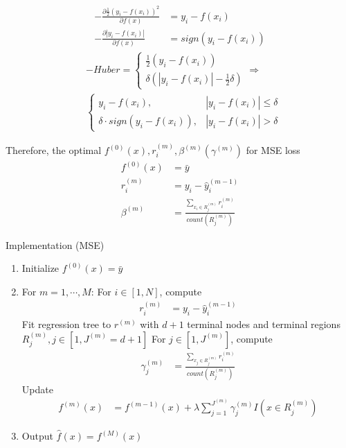 \documentclass[a4paper,12pt,landscape]{article}
\begin{document}
\begin{multicols}{3}
\begin{align*}
    -\frac{\partial\frac{1}{2}(y_i - f(x_i))^2}{\partial f(x)} &= y_i - f(x_i)\\
    -\frac{\partial |y_i - f(x_i)|}{\partial f(x)} &= sign(y_i - f(x_i))
\end{align*}
\begin{align*}
    &-Huber = \begin{cases}
        \frac{1}{2}(y_i - f(x_i))\\
        \delta (|y_i - f(x_i)| - \frac{1}{2}\delta)
        \end{cases} \Rightarrow \\
    &\begin{cases}
        y_i - f(x_i), &|y_i-f(x_i)| \leq \delta\\
        \delta \cdot sign(y_i - f(x_i)), &|y_i - f(x_i)| > \delta
    \end{cases}
\end{align*}

Therefore, the optimal $f^{(0)}(x), r_{i}^{(m)}, \beta^{(m)} (\gamma^{(m)})$ for MSE loss
\begin{align*}
    f^{(0)}(x) &= \bar{y}\\
    r_{i}^{(m)} &= y_i - \hat{y}_i^{(m-1)}\\
    \beta^{(m)} &= \frac{\sum_{x_i\in R_{j}^{(m)}} r_{i}^{(m)}}{count(R_{j}^{(m)})}
\end{align*}

Implementation (MSE)
\begin{enumerate}
    \item Initialize $f^{(0)}(x) = \bar y$
    \item For $m = 1, \cdots, M$:
        \subitem[a] For $i\in[1, N]$, compute\begin{align*}
            r_i^{(m)} &= y_i - \hat{y}_i^{(m-1)}
        \end{align*}
        \subitem[b] Fit regression tree to $r^{(m)}$ with $d+1$ terminal nodes and terminal regions $R_j^{(m)}, j\in[1,
        J^{(m)}=d+1]$
        \subitem[c] For $j\in[1, J^{(m)}]$, compute \begin{align*}
            \gamma_{j}^{(m)} &= \frac{\sum_{x_j\in R_j^{(m)}} r_{i}^{(m)}}{count(R_j^{(m)})}
        \end{align*}
        \subitem[d] Update \begin{align*}
            f^{(m)}(x) &= f^{(m-1)}(x) + \lambda \sum_{j=1}^{J^{(m)}} \gamma_j^{(m)} I(x\in R_j^{(m)})
        \end{align*}
    \item Output $\hat{f}(x) = f^{(M)}(x)$
\end{enumerate}


\end{multicols}
\end{document}
